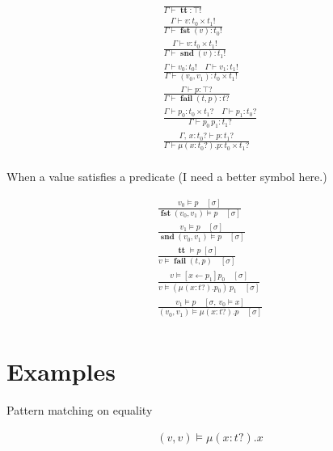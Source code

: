 \documentclass[twocolumn, fleqn]{scrartcl}
\DeclareMathOperator{\coin}{\textbf{tt}}
\DeclareMathOperator{\fst}{\textbf{fst}}
\DeclareMathOperator{\snd}{\textbf{snd}}
\DeclareMathOperator{\fail}{\textbf{fail}}
\DeclareMathOperator{\update}{\leftarrow}
\begin{document}
\begin{multline*}
  \frac{
  }{
    \Gamma \vdash \coin \colon \top !
  }\\
  \frac{
    \Gamma \vdash v \colon t_0 \times t_1 !
  }{
    \Gamma \vdash \fst(v) \colon t_0 !
  }\\
  \frac{
    \Gamma \vdash v \colon t_0 \times t_1 !
  }{
    \Gamma \vdash \snd(v) \colon t_1 !
  }\\
  \frac{
    \Gamma \vdash v_0 \colon t_0 ! \quad
    \Gamma \vdash v_1 \colon t_1 !
  }{
    \Gamma \vdash ( v_0 , v_1 ) \colon t_0 \times t_1 !
  }\\
  \frac{
    \Gamma \vdash p \colon \top ?
  }{
    \Gamma \vdash \fail(t, p) \colon t ?
  }\\
  \frac{
    \Gamma \vdash p_0 \colon t_0 \times t_1 ? \quad
    \Gamma \vdash p_1 \colon t_0 ?
  }{
    \Gamma \vdash p_0 \, p_1 \colon t_1 ?
  }\\
  \frac{
    \Gamma , \, x \colon t_0 ? \vdash p \colon t_1 ?
  }{
    \Gamma \vdash \mu ( x \colon t_0 ? ) . p \colon t_0 \times t_1 ?
  }\\
\end{multline*}

When a value satisfies a predicate (I need a better symbol here.)

\begin{multline*}
\frac{
  v_0 \models p \quad [\sigma]
}{
  \fst ( v_0 , v_1 ) \models p \quad [\sigma]
}\\
\frac{
  v_1 \models p \quad [\sigma]
}{
  \snd ( v_0 , v_1 ) \models p \quad [\sigma]
}\\
\frac{
  \coin \models p \; [\sigma]
}{
  v \models \fail(t, p) \quad [\sigma]
}\\
\frac{
  v \models [x \update p_1] p_0 \quad [\sigma]
}{
  v \models ( \mu (x \colon t ?). p_0) \, p_1 \quad [\sigma]
}\\
\frac{
  v_1 \models p \quad [ \sigma , \, v_0 \models x]
}{
  ( v_0 , v_1 ) \models \mu (x \colon t ?). p \quad [\sigma]
}\\
\end{multline*}

\section*{Examples}

Pattern matching on equality

\begin{multline*}
   ( v , v ) \models \mu (x \colon t ?). x\\
\end{multline*}
\end{document}
